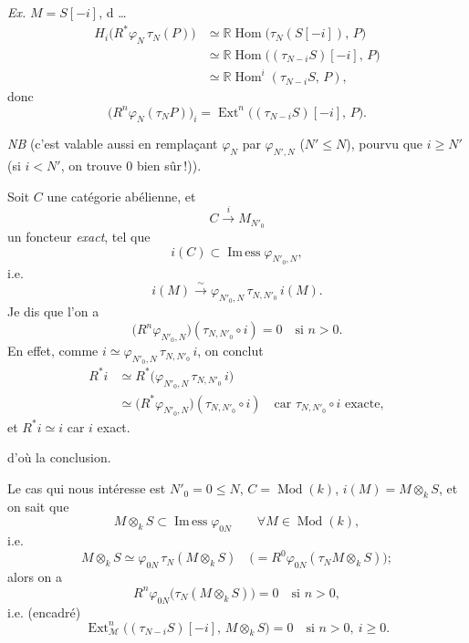 \documentclass[11pt,a4paper]{article}
\begin{document}

\emph{Ex.} $M = S[-i]$, \ill{} d\ill{} …
\[
\begin{aligned}
H_i\bigl(R^{*}\varphi_N\,\tau_N(P)\bigr) &\simeq \mathbb{R}\operatorname{Hom}\bigl(\tau_N(S[-i]),\,P\bigr)\\
&\simeq \mathbb{R}\operatorname{Hom}\bigl((\tau_{N-i}S)[-i],\,P\bigr)\\
&\simeq \mathbb{R}\operatorname{Hom}^{i}(\tau_{N-i}S,\,P),
\end{aligned}
\]
donc
\[
\bigl(R^{n}\varphi_N(\tau_N P)\bigr)_i = \operatorname{Ext}^{n}\bigl((\tau_{N-i}S)[-i],\,P\bigr).
\]

\emph{NB} (c'est valable aussi en remplaçant $\varphi_N$ par $\varphi_{N',N}$ ($N'\leq N$), pourvu que $i \geq N'$ (si $i < N'$, on trouve $0$ bien sûr\,!)).


Soit $C$ une catégorie abélienne,  et
\[
C \xrightarrow{\;i\;} M_{N'_0}
\]
un foncteur \emph{exact}, tel que
\[
i(C) \subset \operatorname{Im\,ess}\varphi_{N'_0,N},
\]
i.e.
\[
i(M) \xrightarrow{\sim} \varphi_{N'_0,N}\,\tau_{N,N'_0}\,i(M).
\]
Je dis que l'on a
\[
\bigl(R^{n}\varphi_{N'_0,N}\bigr)(\tau_{N,N'_0}\circ i) = 0 \quad\text{si } n>0.
\]
En effet, comme $i \simeq \varphi_{N'_0,N}\,\tau_{N,N'_0}\,i$, on conclut
\[
\begin{aligned}
R^{*}i &\simeq R^{*}\bigl(\varphi_{N'_0,N}\,\tau_{N,N'_0}\,i\bigr)\\
&\simeq \bigl(R^{*}\varphi_{N'_0,N}\bigr)(\tau_{N,N'_0}\circ i)
\quad\text{car } \tau_{N,N'_0}\circ i \text{ exacte},
\end{aligned}
\]
et $R^{*}i \simeq i$ car $i$ exact.

d'où la conclusion.

Le cas qui nous intéresse est
$N'_0 = 0 \leq N$, $C = \operatorname{Mod}(k)$, $i(M) = M\otimes_k S$, et on sait que
\[
M\otimes_k S \subset \operatorname{Im\,ess}\varphi_{0N} \qquad \forall M \in \operatorname{Mod}(k),
\]
i.e.
\[
M\otimes_k S \simeq \varphi_{0N}\,\tau_N(M\otimes_k S)
\quad\bigl(= R^{0}\varphi_{0N}(\tau_N M\otimes_k S)\bigr) ;
\]
alors on a
\[
R^{n}\varphi_{0N}\bigl(\tau_N(M\otimes_k S)\bigr) = 0 \quad\text{si } n>0,
\]
i.e. (encadré)
\[
\boxed{\operatorname{Ext}^{n}_{\mathcal{M}}\bigl((\tau_{N-i}S)[-i],\,M\otimes_k S\bigr) = 0 \quad\text{si } n>0,\ i\geq 0.}
\]
\end{document}
